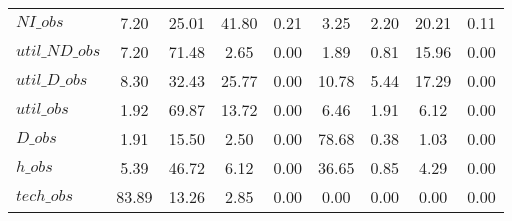 \begin{center}
\begin{longtable}{lcccccccc}
$NI\_obs        $	 & 	         7.20	 & 	        25.01	 & 	        41.80	 & 	         0.21	 & 	         3.25	 & 	         2.20	 & 	        20.21	 & 	         0.11 \\ 
$util\_ND\_obs  $	 & 	         7.20	 & 	        71.48	 & 	         2.65	 & 	         0.00	 & 	         1.89	 & 	         0.81	 & 	        15.96	 & 	         0.00 \\ 
$util\_D\_obs   $	 & 	         8.30	 & 	        32.43	 & 	        25.77	 & 	         0.00	 & 	        10.78	 & 	         5.44	 & 	        17.29	 & 	         0.00 \\ 
$util\_obs      $	 & 	         1.92	 & 	        69.87	 & 	        13.72	 & 	         0.00	 & 	         6.46	 & 	         1.91	 & 	         6.12	 & 	         0.00 \\ 
$D\_obs         $	 & 	         1.91	 & 	        15.50	 & 	         2.50	 & 	         0.00	 & 	        78.68	 & 	         0.38	 & 	         1.03	 & 	         0.00 \\ 
$h\_obs         $	 & 	         5.39	 & 	        46.72	 & 	         6.12	 & 	         0.00	 & 	        36.65	 & 	         0.85	 & 	         4.29	 & 	         0.00 \\ 
$tech\_obs      $	 & 	        83.89	 & 	        13.26	 & 	         2.85	 & 	         0.00	 & 	         0.00	 & 	         0.00	 & 	         0.00	 & 	         0.00 \\ 
\end{longtable}
 \end{center}
